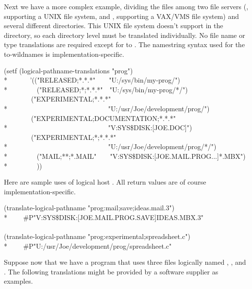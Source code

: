 \begin{newer}
  Next we have a more complex example, dividing the files among two file servers
  (, supporting a UNIX file system, and , supporting a VAX/VMS file system)
  and several different directories.  This UNIX file system doesn't support
   in the directory, so each directory level must
  be translated individually.  No file name or type translations
  are required except for  to .
  The namestring syntax used for the to-wildnames is implementation-specific.
\begin{lisp}
(setf (logical-pathname-translations "prog") \\*
~~~~~~'(("RELEASED;*.*.*"~~~~"U:/sys/bin/my-prog/") \\*
~~~~~~~~("RELEASED;*;*.*.*"~~"U:/sys/bin/my-prog/*/") \\
~~~~~~~~("EXPERIMENTAL;*.*.*" \\*
~~~~~~~~~~~~~~~~~~~~~~~~~~~~~"U:/usr/Joe/development/prog/") \\
~~~~~~~~("EXPERIMENTAL;DOCUMENTATION;*.*.*" \\*
~~~~~~~~~~~~~~~~~~~~~~~~~~~~~"V:SYS\$DISK:[JOE.DOC]") \\
~~~~~~~~("EXPERIMENTAL;*;*.*.*" \\*
~~~~~~~~~~~~~~~~~~~~~~~~~~~~~"U:/usr/Joe/development/prog/*/") \\*
~~~~~~~~("MAIL;**;*.MAIL"~~~~"V:SYS\$DISK:[JOE.MAIL.PROG...]*.MBX") \\*
~~~~~~~~))
\end{lisp}
  Here are sample uses of logical host .  All return values
  are of course implementation-specific.
\begin{lisp}
(translate-logical-pathname "prog:mail;save;ideas.mail.3") \\*
~~~\EV\ \#P"V:SYS\$DISK:[JOE.MAIL.PROG.SAVE]IDEAS.MBX.3" \\
\\
(translate-logical-pathname "prog:experimental;spreadsheet.c") \\*
~~~\EV\ \#P"U:/usr/Joe/development/prog/spreadsheet.c"
\end{lisp}

  Suppose now that we have a program that uses three files logically named ,
  , and .  The following translations might be
  provided by a software supplier as examples.


\end{newer}

